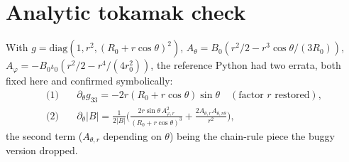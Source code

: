 \documentclass[11pt]{article}
\begin{document}
\section{Analytic tokamak check}
With $g=\mathrm{diag}(1,r^2,(R_0+r\cos\theta)^2)$,
$A_\theta=B_0(r^2/2-r^3\cos\theta/(3R_0))$,
$A_\varphi=-B_0\iota_0(r^2/2-r^4/(4r_0^2))$, the reference Python had two errata,
both fixed here and confirmed symbolically:
\begin{align}
\text{(1)}\quad &\partial_\theta g_{33}=-2r(R_0+r\cos\theta)\sin\theta
\quad(\text{factor }r\text{ restored}),\\
\text{(2)}\quad &\partial_\theta|B|=\frac{1}{2|B|}\Big(
\frac{2r\sin\theta\,A_{\varphi,r}^2}{(R_0+r\cos\theta)^3}
+\frac{2A_{\theta,r}A_{\theta,r\theta}}{r^2}\Big),
\end{align}
the second term ($A_{\theta,r}$ depending on $\theta$) being the chain-rule piece
the buggy version dropped.
\end{document}
